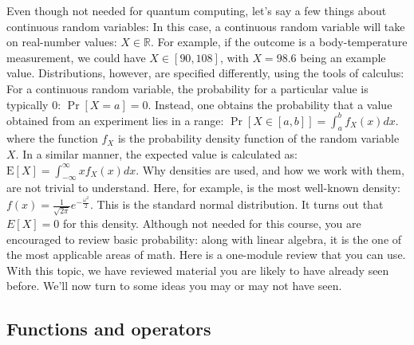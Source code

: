 \documentclass[main.tex]{subfiles}
\begin{document}
Even though not needed for quantum computing, let's say a few things about continuous random variables: In this case, a continuous random variable will take on real-number values: $X \in \mathbb{R}$. For example, if the outcome is a body-temperature measurement, we could have $X \in[90,108]$, with $X=98.6$ being an example value. Distributions, however, are specified differently, using the tools of calculus: For a continuous random variable, the probability for a particular value is typically 0: $\operatorname{Pr}[X=a]=0$. Instead, one obtains the probability that a value obtained from an experiment lies in a range: $\operatorname{Pr}[X \in[a, b]]=\int_{a}^{b} f_{X}(x) d x$. where the function $f_{X}$ is the probability density function of the random variable $X$. In a similar manner, the expected value is calculated as: $\mathrm{E}[X]=\int_{-\infty}^{\infty} x f_{X}(x) d x$. Why densities are used, and how we work with them, are not trivial to understand. Here, for example, is the most well-known density: $f(x)=\frac{1}{\sqrt{2 \pi}} e^{-\frac{\omega^{2}}{2}}$. This is the standard normal distribution. It turns out that $E[X]=0$ for this density. Although not needed for this course, you are encouraged to review basic probability: along with linear algebra, it is the one of the most applicable areas of math. Here is a one-module review that you can use. With this topic, we have reviewed material you are likely to have already seen before. We'll now turn to some ideas you may or may not have seen.

\subsection{Functions and operators}
\end{document}
